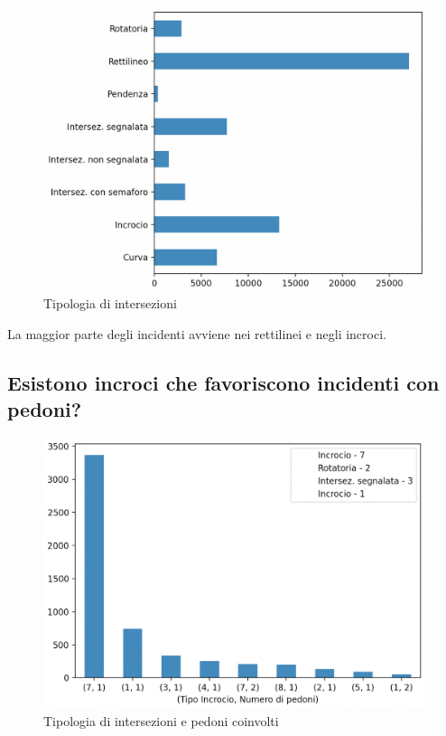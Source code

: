 \documentclass[a4paper]{report}
\begin{document}
\begin{figure}[!ht]
    \includegraphics[width=\linewidth]{../src/incidenti/incidenti_senza_coords/localizzazione_incidente/intersezioni.png}
    \caption{Tipologia di intersezioni}
    \label{fig:tipo_intersezioni}
\end{figure}

La maggior parte degli incidenti avviene nei rettilinei e negli incroci.


\newpage
\subsection{Esistono incroci che favoriscono incidenti con pedoni?}

\begin{figure}[!ht]
    \includegraphics[width=\linewidth]{../src/incidenti/incidenti_senza_coords/pedoni/pedoni_incroci.png}
    \caption{Tipologia di intersezioni e pedoni coinvolti}
    \label{fig:pedoni_intersezioni}
\end{figure}
\end{document}
